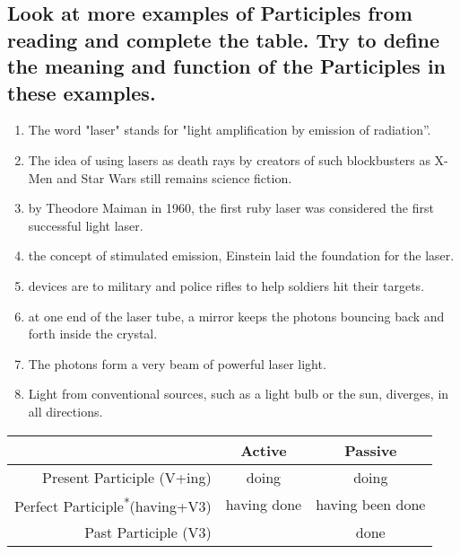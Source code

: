 \subsection*{Look at more examples of Participles from reading and complete the table.
      Try to define the meaning and function of the Participles in these examples.}
\begin{enumerate}
      \item The word "laser" stands for "light amplification by 
            emission of radiation”.
      \item The idea of using lasers as death rays  by creators of
            such blockbusters as X-Men and Star Wars still remains science fiction.
      \item {} by Theodore Maiman in 1960, the first
            ruby laser was considered the first successful light laser.
      \item {} the concept of stimulated emission, Einstein
            laid the foundation for the laser.
      \item {} devices are  to military and
            police rifles to help soldiers hit their targets.
      \item {} at one end of the laser tube, a mirror keeps
            the photons bouncing back and forth inside the crystal.
      \item The  photons form a very 
            beam of powerful laser light.
      \item Light from conventional sources, such as a light bulb or the sun, diverges,
             in all directions.
\end{enumerate}

\begin{small}
      \begin{tabular}{|r|c|c|}
            \hline
                                                             & Active      & Passive          \\
            \hline
            Present Participle (V+ing)                       & doing       & doing            \\
            Perfect Participle\textsuperscript{*}(having+V3) & having done & having been done \\
            Past Participle (V3)                             &             & done             \\
            \hline
      \end{tabular}
\end{small}

